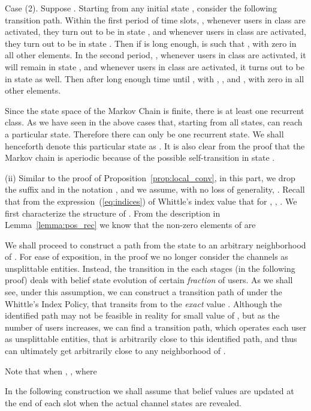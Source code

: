 \documentclass[11pt,twocolumn]{IEEEtran}
\begin{document}
Case (2). Suppose . Starting from any initial state , consider the following transition path. Within the first period of time slots, , whenever users in class  are activated, they turn out to be in state , and whenever users in class  are activated, they turn out to be in state . Then if  is long enough,  is such that , with zero in all other elements. In the second period, , whenever users in class  are activated, it will remain in state , and whenever users in class  are activated, it turns out to be in state  as well. Then after long enough time until ,    with , ,  and , with zero in all other elements.

Since the state space of the Markov Chain  is finite, there is at least one recurrent class. As we have seen in the above cases that, starting from all states,  can reach a particular state. Therefore there can only be one recurrent state. We shall henceforth denote this particular state as . It is also clear from the proof that the Markov chain is aperiodic because of the possible self-transition in state .

(ii) Similar to the proof of Proposition~\ref{prop:local_conv}, in this part, we drop the suffix  and  in the notation , and we assume, with no loss of generality, . Recall that from the expression~(\ref{eq:indices}) of Whittle's index value that  for , , . We first characterize the structure of . From the description in Lemma~\ref{lemma:pos_rec} we know that the non-zero elements of  are


We shall proceed to construct a path from the state  to an arbitrary neighborhood of  . For ease of exposition, in the proof we no longer consider the channels as unsplittable entities. Instead, the transition in the each stages (in the following proof) deals with belief state evolution of certain \emph{fraction} of users. As we shall see, under this assumption, we can construct a transition path of  under the Whittle's Index Policy, that transits from  to the \emph{exact} value . Although the identified path may not be feasible in reality for small value of , but as the number of users  increases, we can find a transition path, which operates each user as unsplittable entities, that is arbitrarily close to this identified path, and thus can ultimately get arbitrarily close to any neighborhood of .

Note that when , , where


In the following construction we shall assume that belief values are updated at the end of each slot when the actual channel states are revealed.
\vspace{6pt}
\end{document}
